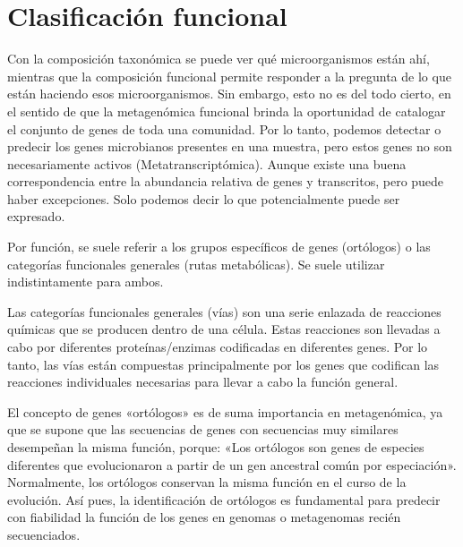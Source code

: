 \chapter{Clasificación funcional}
Con la composición taxonómica se puede ver qué microorganismos están ahí, mientras que la composición funcional permite responder a la pregunta de lo que están haciendo esos microorganismos. Sin embargo, esto no es del todo cierto, en el sentido de que la metagenómica funcional brinda la oportunidad de catalogar el conjunto de genes de toda una comunidad. 
Por lo tanto, podemos detectar o predecir los genes microbianos presentes en una muestra, pero estos genes no son necesariamente activos (Metatranscriptómica).
Aunque existe una buena correspondencia entre la abundancia relativa de genes y transcritos, pero puede haber excepciones. Solo podemos decir lo que potencialmente puede ser expresado.

Por función, se suele referir a los grupos específicos de genes (ortólogos) o las categorías funcionales generales (rutas metabólicas). Se suele utilizar indistintamente para ambos. 

Las categorías funcionales generales (vías) son una serie enlazada de reacciones químicas que se producen dentro de una célula. 
Estas reacciones son llevadas a cabo por diferentes proteínas/enzimas codificadas en diferentes genes.
Por lo tanto, las vías están compuestas principalmente por los genes que codifican las reacciones individuales necesarias para llevar a cabo la función general.

El concepto de genes «ortólogos» es de suma importancia en metagenómica, ya que se supone que las secuencias de genes con secuencias muy similares desempeñan la misma función, porque:
«Los ortólogos son genes de especies diferentes que evolucionaron a partir de un gen ancestral común por especiación».
Normalmente, los ortólogos conservan la misma función en el curso de la evolución. Así pues, la identificación de ortólogos es fundamental para predecir con fiabilidad la función de los genes en genomas o metagenomas recién secuenciados.

